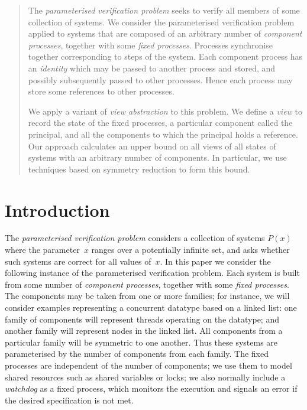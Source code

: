 \begin{abstract}
The \emph{parameterised verification problem} seeks to verify all members of
some collection of systems.  We consider the parameterised verification
problem applied to systems that are composed of an arbitrary number of
\emph{component processes}, together with some \emph{fixed processes}.
Processes synchronise together corresponding to steps of the system.  
Each component process has an \emph{identity} which may be passed to another
process and stored, and possibly subsequently passed to other processes.
Hence each process may store some references to other processes. 

We apply a variant of \emph{view abstraction} to this problem.  We define a
\emph{view} to record the state of the fixed processes, a particular component
called the principal, and all the components to which the principal holds a
reference.  Our approach calculates an upper bound on all views of all states
of systems with an arbitrary number of components.  In particular, we use
techniques based on symmetry reduction to form this bound.  

\end{abstract}


\section{Introduction}

The \emph{parameterised verification problem} considers a collection of
systems $P(x)$ where the parameter~$x$ ranges over a potentially infinite set,
and asks whether such systems are correct for all values of~$x$.  In this
paper we consider the following instance of the parameterised verification
problem.  Each system is built from some number of \emph{component processes},
together with some \emph{fixed processes}.  The components may be taken from
one or more families; for instance, we will consider examples representing a
concurrent datatype based on a linked list: one family of components will
represent threads operating on the datatype; and another family will represent
nodes in the linked list.  All components from a particular family will be
symmetric to one another.  Thus these systems are parameterised by the number
of components from each family.  The fixed processes are independent
of the number of components; we use them to model shared resources such as
shared variables or locks; we also normally include a \emph{watchdog} as a
fixed process, which monitors the execution and signals an error if the
desired specification is not met.

